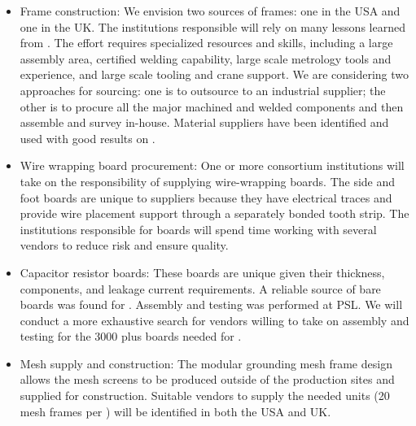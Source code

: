 \begin{itemize}

\item Frame construction: We envision two sources of frames: one in the USA and one in the UK. The institutions responsible will rely on many lessons learned from . The effort requires specialized resources and skills, including a large assembly area, certified welding capability, large scale metrology tools and experience, and large scale tooling and crane support. We are considering two approaches for sourcing: one is to outsource to an industrial supplier; the other is to procure all the major machined and welded components and then assemble and survey in-house. Material suppliers have been identified and used with good results on .

\item Wire wrapping board procurement: One or more consortium institutions will take on the responsibility of supplying wire-wrapping boards. The side and foot boards are unique to suppliers because they have electrical traces and provide wire placement support through a separately bonded tooth strip. %
The institutions responsible for boards will spend time working with several vendors to reduce risk and ensure quality. 

\item Capacitor resistor boards: These boards are unique given their thickness, 
 components, and leakage current requirements. A reliable source of bare boards was found for . Assembly and testing was performed at PSL. We will conduct a more exhaustive search for vendors willing to take on assembly and testing for the \num{3000} plus boards needed for .

\item Mesh supply and construction: The modular grounding mesh frame design allows the mesh screens to be produced outside of the  production sites and supplied for  construction.  Suitable vendors to supply the needed units (20 mesh frames per ) will be identified in both the USA and UK.   %


\end{itemize}
